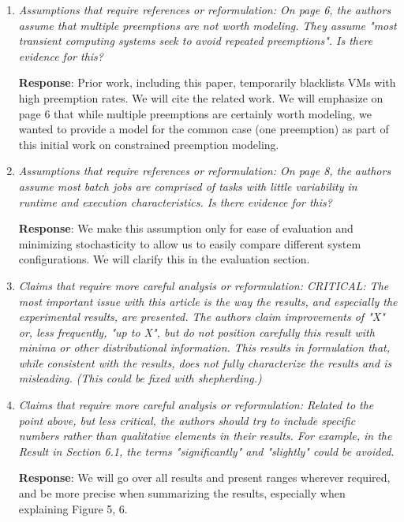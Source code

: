 \documentclass{article}
\newcommand{\resp}[1]{\textbf{Response}: #1}
\newcommand{\revmade}[1]{\textbf{Revision Made}: #1}
\begin{document}
\begin{enumerate}


\item \emph{Assumptions that require references or reformulation: On page 6, the authors assume that multiple preemptions are not worth modeling. They assume "most transient computing systems seek to avoid repeated preemptions". Is there evidence for this?}

  \resp{Prior work, including this paper, temporarily blacklists VMs with high preemption rates. We will cite the related work. We will emphasize on page 6 that while multiple preemptions are certainly worth modeling, we wanted to provide a model for the common case (one preemption) as part of this initial work on constrained preemption modeling.}


\item \emph{Assumptions that require references or reformulation: On page 8, the authors assume most batch jobs are comprised of tasks with little variability in runtime and execution characteristics. Is there evidence for this?}

\resp{We make this assumption only for ease of evaluation and minimizing stochasticity to allow us to easily compare different system configurations. We will clarify this in the evaluation section.}


\item \emph{Claims that require more careful analysis or reformulation: CRITICAL: The most important issue with this article is the way the results, and especially the experimental results, are presented. The authors claim improvements of "X" or, less frequently, "up to X", but do not position carefully this result with minima or other distributional information. This results in formulation that, while consistent with the results, does not fully characterize the results and is misleading. (This could be fixed with shepherding.)}

\item \emph{Claims that require more careful analysis or reformulation: Related to the point above, but less critical, the authors should try to include specific numbers rather than qualitative elements in their results. For example, in the Result in Section 6.1, the terms "significantly" and "slightly" could be avoided.}

\resp{We will go over all results and present ranges wherever required, and be more precise when summarizing the results, especially when explaining Figure 5, 6. }



\end{enumerate}
\end{document}
